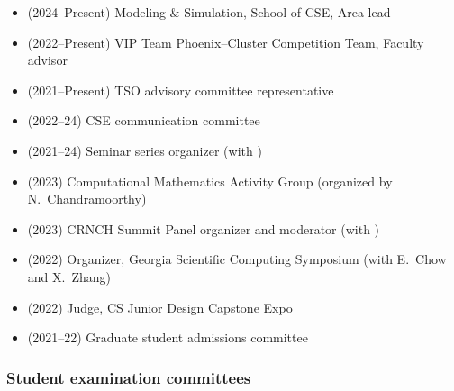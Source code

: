\begin{itemize}
    \item (2024--Present) Modeling \& Simulation, School of CSE, Area lead
    \item (2022--Present) VIP Team Phoenix--Cluster Competition Team, Faculty advisor
    \item (2021--Present) TSO advisory committee representative
    \item (2022--24) CSE communication committee
    \item (2021--24) Seminar series organizer (with \Florian)
    \item (2023) Computational Mathematics Activity Group (organized by N.\ Chandramoorthy)
    \item (2023) CRNCH Summit Panel organizer and moderator (with \Rich)
    \item (2022) Organizer, Georgia Scientific Computing Symposium (with E.\ Chow and X.\ Zhang)
    \item (2022) Judge, CS Junior Design Capstone Expo
    \item (2021--22) Graduate student admissions committee
\end{itemize}

\subsubsection{Student examination committees}

